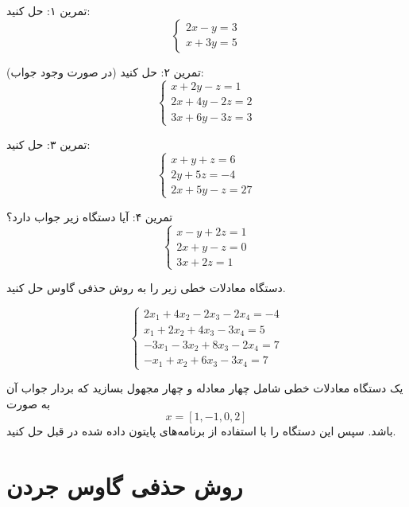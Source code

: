 \begin{exercise}
 تمرین ۱:
حل کنید:
\[
\begin{cases}
	2x - y = 3 \\
	x + 3y = 5
\end{cases}
\]

تمرین ۲:
حل کنید (در صورت وجود جواب):
\[
\begin{cases}
	x + 2y - z = 1 \\
	2x + 4y - 2z = 2 \\
	3x + 6y - 3z = 3
\end{cases}
\]

تمرین ۳:
حل کنید:
\[
\begin{cases}
	x + y + z = 6 \\
	2y + 5z = -4 \\
	2x + 5y - z = 27
\end{cases}
\]

تمرین ۴:
آیا دستگاه زیر جواب دارد؟
\[
\begin{cases}
	x - y + 2z = 1 \\
	2x + y - z = 0 \\
	3x + 2z = 1
\end{cases}
\]	
\end{exercise} 
\begin{exercise}
	دستگاه معادلات خطی زیر را به روش حذفی گاوس حل کنید.
	
	\[
	\begin{cases}
		2x_1 + 4x_2 - 2x_3 - 2x_4 = -4 \\
		x_1 + 2x_2 + 4x_3 - 3x_4 = 5 \\
		-3x_1 - 3x_2 + 8x_3 - 2x_4 = 7 \\
		-x_1 + x_2 + 6x_3 - 3x_4 = 7
	\end{cases}
	\]
	
\end{exercise}

\begin{code}
	\begin{latin}
		  
	\end{latin}
\end{code}

\begin{exercise}
	یک دستگاه معادلات خطی شامل چهار معادله و چهار مجهول بسازید که بردار جواب آن به صورت 
	$$x=[1,-1,0,2]$$
	باشد. سپس این دستگاه را با استفاده از برنامه‌های پایتون داده شده در قبل حل کنید.
\end{exercise}
\section{روش حذفی گاوس جردن}

